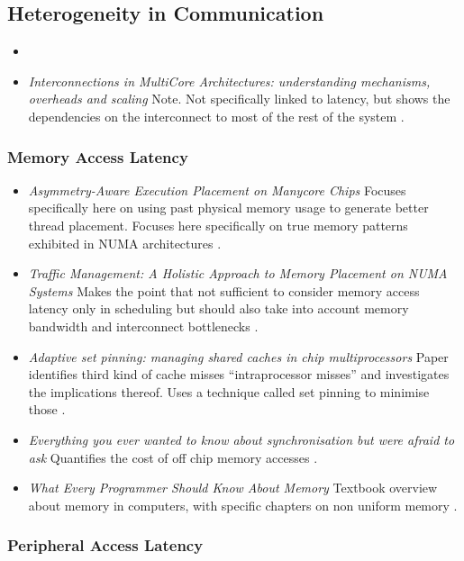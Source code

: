 \subsection{Heterogeneity in Communication}

\begin{itemize}
\item \item \emph{Interconnections in MultiCore Architectures: understanding mechanisms,
overheads and scaling} Note. Not specifically linked to latency, but 
shows the dependencies on the interconnect to most of the rest of the system \cite{1431574}.
\end{itemize}

\subsubsection{Memory Access Latency}
\begin{itemize}
\item \emph{Asymmetry-Aware Execution Placement on Manycore Chips} Focuses
specifically here on using past physical memory usage to generate better thread
placement. Focuses here specifically on true memory patterns exhibited in 
NUMA architectures \cite{atumanov-sfma13}.
\item \emph{Traffic Management: A Holistic Approach to Memory Placement on NUMA Systems}
Makes the point that not sufficient to consider memory access latency only in scheduling
but should also take into account memory bandwidth and interconnect bottlenecks \cite{Dashti:2013:TMH:2451116.2451157}.
\item \emph{Adaptive set pinning: managing shared caches in chip multiprocessors}
Paper identifies third kind of cache misses ``intraprocessor misses'' and
investigates the implications thereof. Uses a technique called
set pinning to minimise those \cite{Srikantaiah08adaptiveset}.
\item \emph{Everything you ever wanted to know about synchronisation but
were afraid to ask} Quantifies the cost of off chip memory accesses \cite{David:2013:EYA:2517349.2522714}.
\item \emph{What Every Programmer Should Know About Memory} Textbook overview
about memory in computers, with specific chapters on non uniform memory \cite{Drepper07whatevery}.
\end{itemize}
\subsubsection{Peripheral Access Latency}

